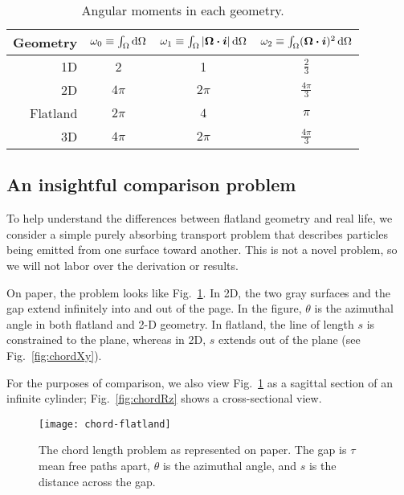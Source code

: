 \begin{table}[htb]
  \centering
  \begin{tabular}{rccc}
\toprule
   Geometry
   & $\omega_0 \equiv \int_\Omega \mathop{}\!\mathrm{d}\Omega$
   & $\omega_1 \equiv \int_\Omega \left| \bm{\Omega}\bm{\cdot}\bm{i} \right| \mathop{}\!\mathrm{d}\Omega$
   & $\omega_2 \equiv \int_\Omega (\bm{\Omega}\bm{\cdot}\bm{i})^2 \mathop{}\!\mathrm{d}\Omega$
\\ \midrule
   1D & 2 & 1 & $\frac{2}{3}$
   \\
   2D & $4\pi$ & $2\pi$ & $\frac{4\pi}{3}$
   \\
   Flatland & $2\pi$ & $4$ & $\pi$
   \\
   3D & $4\pi$ & $2\pi$ & $\frac{4\pi}{3}$
\\ \bottomrule
  \end{tabular}
  \caption{Angular moments in each geometry.}
  \label{tab:angularMoments}
\end{table}

\subsection{An insightful comparison problem}
To help understand the differences between flatland geometry and real life, we
consider a simple purely absorbing transport problem that describes particles
being emitted from one surface toward another.
This is not a novel problem, so we will not labor over the derivation or
results.

On paper, the problem looks like Fig.~\ref{fig:chordFlatland}. In 2D, the two
gray surfaces and the gap extend infinitely into and out of the page.
In the figure, $\theta$ is the azimuthal angle in both flatland and 2-D
geometry. In flatland, the line of length $s$ is constrained to the plane,
whereas in 2D, $s$ extends out of the plane (see Fig.~\ref{fig:chordXy}).

For the purposes of comparison, we also view Fig.~\ref{fig:chordFlatland} as a
sagittal section of an infinite cylinder; Fig.~\ref{fig:chordRz} shows a
cross-sectional view.

\begin{figure}[htb]
  \centering
  \texttt{[image: chord-flatland]}
  \caption[The chord length problem as represented on paper.]%
  {The chord length problem as represented on paper. The gap is
  $\tau$ mean free paths apart, $\theta$ is the azimuthal angle, and $s$ is the
  distance across the gap.}
  \label{fig:chordFlatland}
\end{figure}

